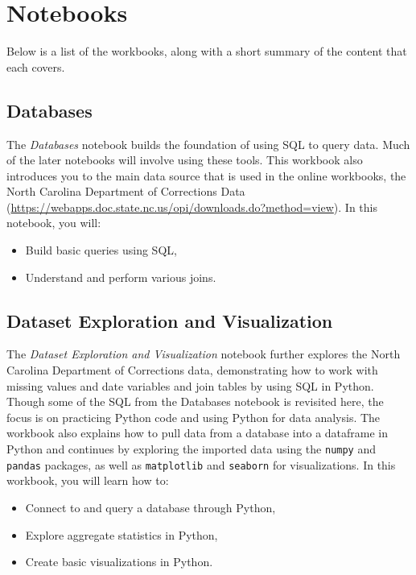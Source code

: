 \documentclass[]{krantz}
\begin{document}
\section{Notebooks}\label{notebooks}

Below is a list of the workbooks, along with a short summary of the
content that each covers.

\subsection{Databases}\label{databases}

The \emph{Databases} notebook builds the foundation of using SQL to
query data. Much of the later notebooks will involve using these tools.
This workbook also introduces you to the main data source that is used
in the online workbooks, the North Carolina Department of Corrections
Data
(\url{https://webapps.doc.state.nc.us/opi/downloads.do?method=view}). In
this notebook, you will:

\begin{itemize}
\item
  Build basic queries using SQL,
\item
  Understand and perform various joins.
\end{itemize}

\subsection{Dataset Exploration and
Visualization}\label{dataset-exploration-and-visualization}

The \emph{Dataset Exploration and Visualization} notebook further
explores the North Carolina Department of Corrections data,
demonstrating how to work with missing values and date variables and
join tables by using SQL in Python. Though some of the SQL from the
Databases notebook is revisited here, the focus is on practicing Python
code and using Python for data analysis. The workbook also explains how
to pull data from a database into a dataframe in Python and continues by
exploring the imported data using the \texttt{numpy} and \texttt{pandas}
packages, as well as \texttt{matplotlib} and \texttt{seaborn} for
visualizations. In this workbook, you will learn how to:

\begin{itemize}
\item
  Connect to and query a database through Python,
\item
  Explore aggregate statistics in Python,
\item
  Create basic visualizations in Python.
\end{itemize}
\end{document}
